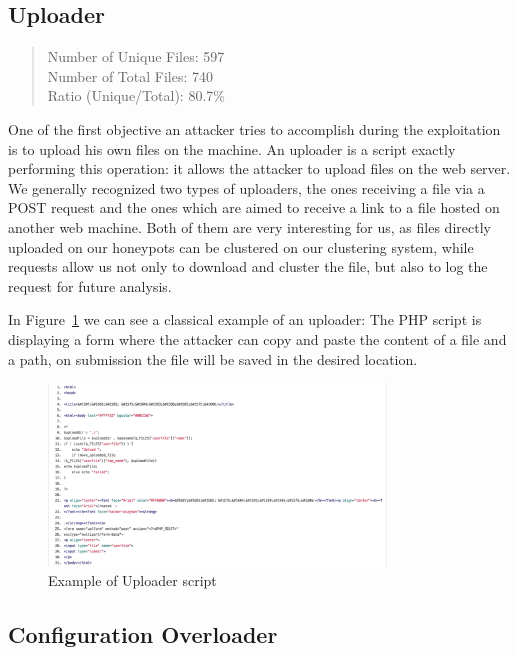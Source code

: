 \subsection{Uploader}

\begin{quote}
Number of Unique Files: 597\\
Number of Total Files: 740\\
Ratio (Unique/Total): 80.7\%
\end{quote}

One of the first objective an attacker tries to accomplish during the exploitation is to upload his own files on the machine. An uploader is a script exactly performing this operation: it allows the attacker to upload files on the web server. We generally recognized two types of uploaders, the ones receiving a file via a POST request and the ones which are aimed to receive a link to a file hosted on another web machine. Both of them are very interesting for us, as files directly uploaded on our honeypots can be clustered on our clustering system, while requests allow us not only to download and cluster the file, but also to log the request for future analysis.

In Figure~\ref{fig:uploader} we can see a classical example of an uploader: The PHP script is displaying a form where the attacker can copy and paste the content of a file and a path, on submission the file will be saved in the desired location.

\begin{figure}[H]
\centerline{\includegraphics[width=0.8\textwidth]{Images/uploader.jpg}}
\caption{Example of Uploader script\label{fig:uploader}}
\end{figure}

\subsection{Configuration Overloader}

